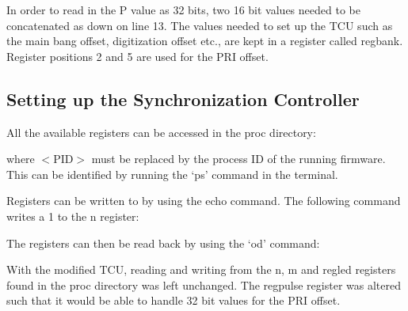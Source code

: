 \documentclass[12pt, a4paper]{article}
\begin{document}
In order to read in the P value as 32 bits, two 16 bit values needed to be concatenated as down on line 13. The values needed to set up the TCU such as the main bang offset, digitization offset etc., are kept in a register called reg\textunderscore bank. Register positions 2 and 5 are used for the PRI offset.

\subsection{Setting up the Synchronization Controller} \label{syn_control_setup}
All the available registers can be accessed in the proc directory:


where $<$PID$>$ must be replaced by the process ID of the running firmware. This can be identified by running the ‘ps’ command in the terminal.

Registers can be written to by using the echo command. The following command writes a 1 to the n register:



The registers can then be read back by using the ‘od’ command:




With the modified TCU, reading and writing from the n, m and reg\textunderscore led registers found in the proc directory was left unchanged. The reg\textunderscore pulse register was altered such that it would be able to handle 32 bit values for the PRI offset.
\end{document}

